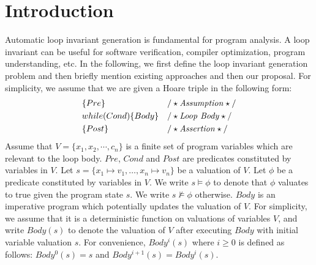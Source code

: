 
\section{Introduction} %
\label{sec:introduction}
Automatic loop invariant generation is fundamental for program analysis. A loop invariant can be useful for software verification, compiler optimization, program understanding, etc. In the following, we first define the loop invariant generation problem and then briefly mention existing approaches and then our proposal. For simplicity, we assume that we are given a Hoare triple in the following form:
\begin{align*}
&\{Pre\} & & /\star\text{\emph{Assumption}}\star/ \\
&while (Cond) \{ Body \} && /\star\text{\emph{Loop Body}}\star/\\
&\{Post\} & & /\star\text{\emph{Assertion}}\star/
\end{align*}
Assume that $V = \{x_1, x_2, \cdots, c_n\}$ is a finite set of program variables which are relevant to the loop body. $Pre$, $Cond$ and $Post$ are predicates constituted by variables in $V$.
Let $s = \{ x_1 \mapsto v_1, \ldots, x_n \mapsto v_n \}$ be a valuation of $V$. Let $\phi$ be a predicate constituted by variables in $V$. We write $s \models \phi$ to denote that $\phi$ valuates to true given the program state $s$. We write $s \not \models \phi$ otherwise.
$Body$ is an imperative program which potentially updates the valuation of $V$. For simplicity, we assume that it is a deterministic function on valuations of variables $V$, and write $Body(s)$ to denote the valuation of $V$ after executing $Body$ with initial variable valuation $s$. For convenience, $Body^i(s)$ where $i \geq 0$ is defined as follows: $Body^0(s) = s$ and $Body^{i+1}(s) = Body^i(s)$.


